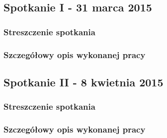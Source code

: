 \par{}

\subsection*{Spotkanie I - 31 marca 2015}

\par{}

\subsubsection*{Streszczenie spotkania}

\par{}

\subsubsection*{Szczegółowy opis wykonanej pracy}

\par{}

\subsection*{Spotkanie II - 8 kwietnia 2015}

\par{}

\subsubsection*{Streszczenie spotkania}

\par{}

\subsubsection*{Szczegółowy opis wykonanej pracy}

\par{}